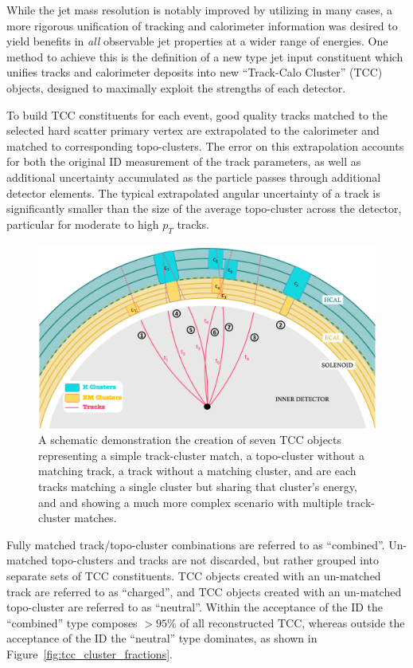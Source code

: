 While the jet mass resolution is notably improved by utilizing \mTA in many cases, a more rigorous unification of tracking and calorimeter information was desired to yield benefits in \textit{all} observable jet properties at a wider range of energies.
One method to achieve this is the definition of a new type jet input constituent which unifies tracks and calorimeter deposits into new ``Track-Calo Cluster'' (TCC) objects, designed to maximally exploit the strengths of each detector.

To build TCC constituents for each event, good quality tracks matched to the selected hard scatter primary vertex are extrapolated to the calorimeter and matched to corresponding topo-clusters.
The error on this extrapolation accounts for both the original ID measurement of the track parameters, as well as additional uncertainty accumulated as the particle passes through additional detector elements.
The typical extrapolated angular uncertainty of a track is significantly smaller than the size of the average topo-cluster across the detector, particular for moderate to high $p_T$ tracks.

\begin{figure}
	\centering
	\includegraphics[width=\textwidth]{TCC_cartoon}
	\caption{
	A schematic demonstration the creation of seven TCC objects representing  a simple track-cluster match,  a topo-cluster without a matching track,  a track without a matching cluster,  and  are each tracks matching a single cluster but sharing that cluster's energy, and  and  showing a much more complex scenario with multiple track-cluster matches.
    \cite{ATL-PHYS-PUB-2017-015}
	}
	\label{fig:tcc_cartoon}
\end{figure}

Fully matched track/topo-cluster combinations are referred to as ``combined''.
Un-matched topo-clusters and tracks are not discarded, but rather grouped into separate sets of TCC constituents.
TCC objects created with an un-matched track are referred to as ``charged'', and TCC objects created with an un-matched topo-cluster are referred to as ``neutral''.
Within the acceptance of the ID the ``combined'' type composes $> 95\%$ of all reconstructed TCC, whereas outside the acceptance of the ID the ``neutral'' type dominates, as shown in Figure~\ref{fig:tcc_cluster_fractions}.

